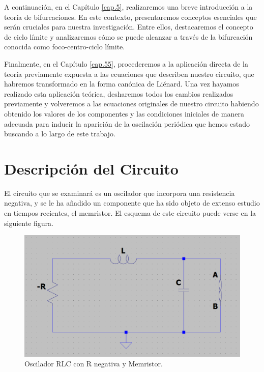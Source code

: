 \documentclass[12pt,a4paper]{report} %
\begin{document}
	\vspace{0.5cm} A continuación, en el Capítulo \ref{cap.5}, realizaremos una breve introducción a la teoría de bifurcaciones. En este contexto, presentaremos conceptos esenciales que serán cruciales para nuestra investigación. Entre ellos, destacaremos el concepto de ciclo límite y analizaremos cómo se puede alcanzar a través de la bifurcación conocida como foco-centro-ciclo límite.
	
	\vspace{0.5cm} Finalmente, en el Capítulo \ref{cap.55}, procederemos a la aplicación directa de la teoría previamente expuesta a las ecuaciones que describen nuestro circuito, que habremos transformado en la forma canónica de Liénard. Una vez hayamos realizado esta aplicación teórica, desharemos todos los cambios realizados previamente y volveremos a las ecuaciones originales de nuestro circuito habiendo obtenido los valores de los componentes y las condiciones iniciales de manera adecuada para inducir la aparición de la oscilación periódica que hemos estado buscando a lo largo de este trabajo.
	
	
	\newpage
	
	\chapter{Descripción del Circuito}
	\label{cap.1}

	El circuito que se examinará es un oscilador que incorpora una resistencia negativa, y se le ha añadido un componente que ha sido objeto de extenso estudio en tiempos recientes, el memristor. El esquema de este circuito puede verse en la siguiente figura.
	
	\vspace{0.5cm}\begin{figure}[h]
		\centering
		\includegraphics[width=1\textwidth]{-RLCM.png}
		\caption{Oscilador RLC con R negativa y Memristor.}
		\label{fig:-RLCM}
	\end{figure}\smallskip
	
\end{document}

